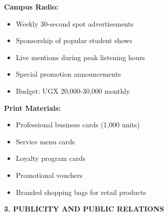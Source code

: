 \textbf{Campus Radio:}
\begin{itemize}[leftmargin=2em]
    \item Weekly 30-second spot advertisements
    \item Sponsorship of popular student shows
    \item Live mentions during peak listening hours
    \item Special promotion announcements
    \item Budget: UGX 20,000-30,000 monthly
\end{itemize}

\textbf{Print Materials:}
\begin{itemize}[leftmargin=2em]
    \item Professional business cards (1,000 units)
    \item Service menu cards
    \item Loyalty program cards
    \item Promotional vouchers
    \item Branded shopping bags for retail products
\end{itemize}

\vspace{1em}

\textbf{3. PUBLICITY AND PUBLIC RELATIONS}

